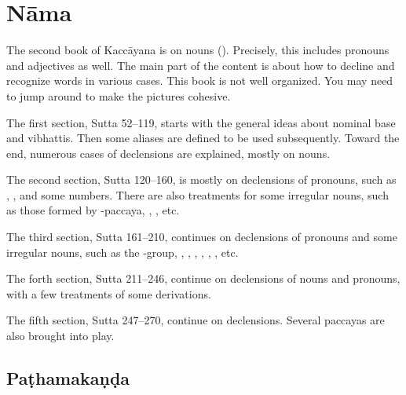 \chapter{Nāma}

The second book of Kaccāyana is on nouns (). Precisely, this includes pronouns and adjectives as well. The main part of the content is about how to decline and recognize words in various cases. This book is not well organized. You may need to jump around to make the pictures cohesive.

The first section, Sutta 52--119, starts with the general ideas about nominal base and vibhattis. Then some aliases are defined to be used subsequently. Toward the end, numerous cases of declensions are explained, mostly on nouns.

The second section, Sutta 120--160, is mostly on declensions of pronouns, such as , , and some numbers. There are also treatments for some irregular nouns, such as those formed by -paccaya, , , etc.

The third section, Sutta 161--210, continues on declensions of pronouns and some irregular nouns, such as the -group, , , , , , , etc. 

The forth section, Sutta 211--246, continue on declensions of nouns and pronouns, with a few treatments of some derivations.

The fifth section, Sutta 247--270, continue on declensions. Several paccayas are also brought into play.

\section{Paṭhamakaṇḍa}
\raggedbottom


